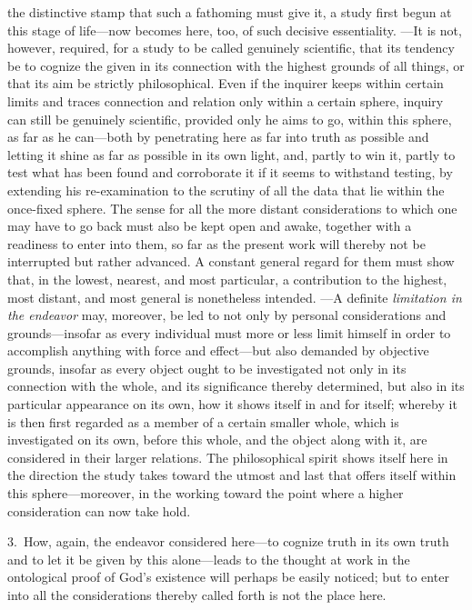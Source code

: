 \documentclass[12pt,a4paper]{book}
\begin{document}
the distinctive stamp that such a fathoming must give it, a study first begun at
this stage of life---now becomes here, too, of such decisive essentiality. ---It
is not, however, required, for a study to be called genuinely scientific, that its
tendency be to cognize the given in its connection with the highest grounds of all
things, or that its aim be strictly philosophical. Even if the inquirer keeps
within certain limits and traces connection and relation only within a certain
sphere, inquiry can still be genuinely scientific, provided only he aims to go,
within this sphere, as far as he can---both by penetrating here as far into truth
as possible and letting it shine as far as possible in its own light, and, partly
to win it, partly to test what has been found and corroborate it if it seems to
withstand testing, by extending his re-examination to the scrutiny of all the data
that lie within the once-fixed sphere. The sense for all the more distant
considerations to which one may have to go back must also be kept open and awake,
together with a readiness to enter into them, so far as the present work will
thereby not be interrupted but rather advanced. A constant general regard for them
must show that, in the lowest, nearest, and most particular, a contribution to the
highest, most distant, and most general is nonetheless intended. ---A definite
\emph{limitation in the endeavor} may, moreover, be led to not only by personal
considerations and grounds---insofar as every individual must more or less limit
himself in order to accomplish anything with force and effect---but also demanded
by objective grounds, insofar as every object ought to be investigated not only in
its connection with the whole, and its significance thereby determined, but also in
its particular appearance on its own, how it shows itself in and for itself;
whereby it is then first regarded as a member of a certain smaller whole, which is
investigated on its own, before this whole, and the object along with it, are
considered in their larger relations. The philosophical spirit shows itself here
in the direction the study takes toward the utmost and last that offers itself
within this sphere---moreover, in the working toward the point where a higher
consideration can now take hold.

3.~How, again, the endeavor considered here---to cognize truth in its own truth
and to let it be given by this alone---leads to the thought at work in the
ontological proof of God's existence will perhaps be easily noticed; but to enter
into all the considerations thereby called forth is not the place here.
\end{document}
